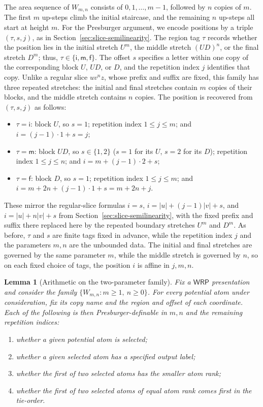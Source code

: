\documentclass[11pt]{article}
\newtheorem{lemma}[theorem]{Lemma}
\theoremstyle{definition}
\newcommand{\WRP}{\mathsf{WRP}}
\begin{document}
The area sequence of $W_{m,n}$ consists of $0,1,\ldots,m-1$, followed by
$n$ copies of $m$.  The first $m$ up-steps climb the initial staircase, and the
remaining $n$ up-steps all start at height $m$.  For the Presburger argument,
we encode positions by a triple
$(\tau,s,j)$, as in Section~\ref{sec:slice-semilinearity}.  The region tag
$\tau$ records whether the position lies in the initial stretch $U^m$, the
middle stretch $(UD)^n$, or the final stretch $D^m$; thus,
$\tau\in\{\mathsf i,\mathsf m,\mathsf f\}$.  The offset $s$ specifies a letter
within one copy of the corresponding block $U$, $UD$, or $D$, and the
repetition index $j$ identifies that copy.  Unlike a regular slice $uv^nz$,
whose prefix and suffix are fixed, this family has three repeated stretches:
the initial and final stretches contain $m$ copies of their blocks, and the
middle stretch contains $n$ copies.  The position is recovered from
$(\tau,s,j)$ as follows:
\begin{itemize}
\item $\tau=\mathsf i$: block $U$, so $s=1$; repetition index $1\le j\le m$; and
$i=(j-1)\cdot 1+s=j$;
\item $\tau=\mathsf m$: block $UD$, so $s\in\{1,2\}$ ($s=1$ for its $U$, $s=2$ for
its $D$); repetition index $1\le j\le n$; and $i=m+(j-1)\cdot 2+s$;
\item $\tau=\mathsf f$: block $D$, so $s=1$; repetition index $1\le j\le m$; and
$i=m+2n+(j-1)\cdot 1+s=m+2n+j$.
\end{itemize}
These mirror the regular-slice formulas
$i=s$, $i=|u|+(j-1)|v|+s$, and $i=|u|+n|v|+s$ from
Section~\ref{sec:slice-semilinearity}, with the fixed prefix and suffix there
replaced here by the repeated boundary stretches $U^m$ and $D^m$.  As before, $\tau$ and $s$
are finite tags fixed in advance, while the repetition index $j$ and the
parameters $m,n$ are the unbounded data.  The initial and final stretches are
governed by the same parameter $m$, while the middle stretch is governed by
$n$, so on each fixed choice of tags, the position $i$ is affine in $j,m,n$.

\begin{lemma}[Arithmetic on the two-parameter family]
\label{lem:two-parameter-presburger}
Fix a $\WRP$ presentation and consider the family
$\{W_{m,n}:m\ge 1,\ n\ge 0\}$.  For every potential atom under consideration,
fix its copy name and the region and offset of each coordinate.  Each of the
following is then Presburger-definable in $m,n$ and the remaining repetition
indices:
\begin{enumerate}[label=(\alph*)]
\item whether a given potential atom is selected;
\item whether a given selected atom has a specified output label;
\item whether the first of two selected atoms has the smaller atom rank;
\item whether the first of two selected atoms of equal atom rank comes first in
the tie-order.
\end{enumerate}
\end{lemma}
\end{document}
